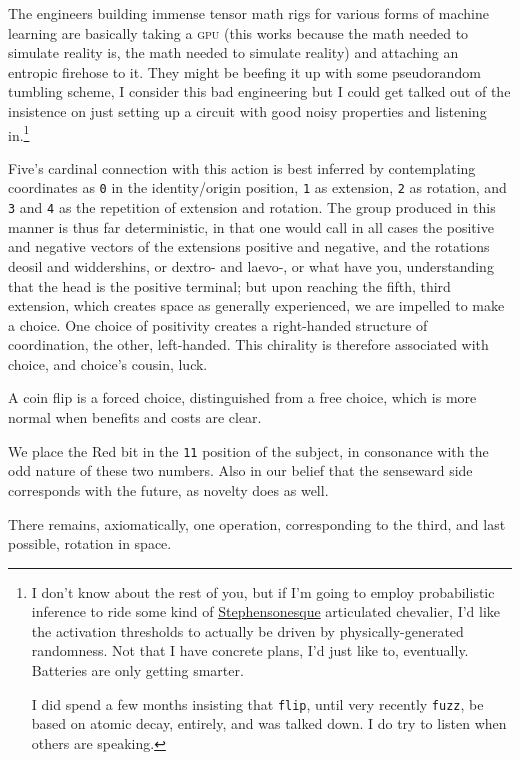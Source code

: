 \documentclass[twoside]{article}
\begin{document}
The engineers building immense tensor math rigs for various forms of machine learning are basically taking a \textsc{gpu} (this works because the math needed to simulate reality is, the math needed to simulate reality) and attaching an entropic firehose to it. They might be beefing it up with some pseudorandom tumbling scheme, I consider this bad engineering but I could get talked out of the insistence on just setting up a circuit with good noisy properties and listening in.\footnote{I don't know about the rest of you, but if I'm going to employ probabilistic inference to ride some kind of \href{https://en.wikipedia.org/wiki/The_Diamond_Age}{Stephensonesque} articulated chevalier, I'd like the activation thresholds to actually be driven by physically-generated randomness. Not that I have concrete plans, I'd just like to, eventually. Batteries are only getting smarter.

I did spend a few months insisting that \texttt{flip}, until very recently \texttt{fuzz}, be based on atomic decay, entirely, and was talked down. I do try to listen when others are speaking.}

Five's cardinal connection with this action is best inferred by contemplating coordinates as \texttt{0} in the identity/origin position, \texttt{1} as extension, \texttt{2} as rotation, and \texttt{3} and \texttt{4} as the repetition of extension and rotation. The group produced in this manner is thus far deterministic, in that one would call in all cases the positive and negative vectors of the extensions positive and negative, and the rotations deosil and widdershins, or dextro- and laevo-, or what have you, understanding that the head is the positive terminal; but upon reaching the fifth, third extension, which creates space as generally experienced, we are impelled to make a choice. One choice of positivity creates a right-handed structure of coordination, the other, left-handed. This chirality is therefore associated with choice, and choice's cousin, luck.

A coin flip is a forced choice, distinguished from a free choice, which is more normal when benefits and costs are clear.

We place the Red bit in the \texttt{11} position of the subject, in consonance with the odd nature of these two numbers. Also in our belief that the senseward side corresponds with the future, as novelty does as well.

There remains, axiomatically, one operation, corresponding to the third, and last possible, rotation in space.
\end{document}
